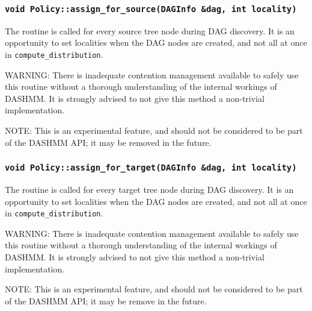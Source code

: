 \subsubsection{\texttt{void Policy::assign\_for\_source(DAGInfo \&dag, int locality)}}

The routine is called for every source tree node during DAG discovery. It is an
opportunity to set localities when the DAG nodes are created, and not all at
once in \texttt{compute\_distribution}.

WARNING: There is inadequate contention management available to safely use this
routine without a thorough understanding of the internal workings of DASHMM.
It is strongly advised to not give this method a non-trivial implementation.

NOTE: This is an experimental feature, and should not be considered to be part
of the DASHMM API; it may be removed in the future.

\subsubsection{\texttt{void Policy::assign\_for\_target(DAGInfo \&dag, int locality)}}

The routine is called for every target tree node during DAG discovery. It is an
opportunity to set localities when the DAG nodes are created, and not all at
once in \texttt{compute\_distribution}.

WARNING: There is inadequate contention management available to safely use this
routine without a thorough understanding of the internal workings of DASHMM.
It is strongly advised to not give this method a non-trivial implementation.

NOTE: This is an experimental feature, and should not be considered to be part
of the DASHMM API; it may be remove in the future.

